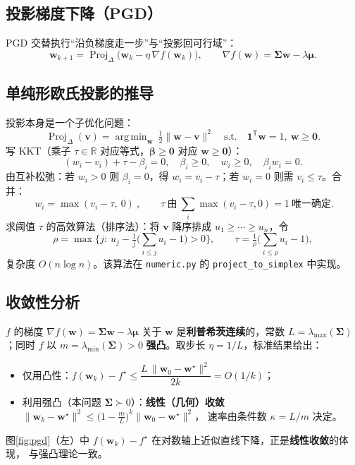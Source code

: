 \documentclass[12pt]{ctexart}
\newcommand{\R}{\mathbb{R}}
\newcommand{\w}{\bm{w}}
\newcommand{\muv}{\bm{\mu}}
\newcommand{\Sig}{\bm{\Sigma}}
\newcommand{\one}{\mathbf{1}}
\newcommand{\T}{^{\mathsf{T}}}
\DeclareMathOperator*{\argmin}{arg\,min}
\theoremstyle{definition}
\theoremstyle{plain}
\begin{document}
\subsection{投影梯度下降（PGD）}
PGD 交替执行“沿负梯度走一步”与“投影回可行域”：
\begin{equation}
\w_{k+1}=\operatorname{Proj}_{\Delta}\!\big(\w_k-\eta\,\nabla f(\w_k)\big),
\qquad \nabla f(\w)=\Sig\w-\lambda\muv .
\label{eq:pgd}
\end{equation}

\subsection{单纯形欧氏投影的推导}
投影本身是一个子优化问题：
\begin{equation}
\operatorname{Proj}_{\Delta}(\bm v)=\argmin_{\w}\ \tfrac12\|\w-\bm v\|^2
\quad\text{s.t.}\quad \one\T\w=1,\ \w\ge\bm0 .
\end{equation}
写 KKT（乘子 $\tau\in\R$ 对应等式，$\bm\beta\ge\bm0$ 对应 $\w\ge\bm0$）：
\[
(w_i-v_i)+\tau-\beta_i=0,\quad \beta_i\ge0,\quad w_i\ge0,\quad \beta_i w_i=0 .
\]
由互补松弛：若 $w_i>0$ 则 $\beta_i=0$，得 $w_i=v_i-\tau$；若 $w_i=0$ 则需 $v_i\le\tau$。合并：
\begin{equation}
\boxed{\ w_i=\max(v_i-\tau,\ 0)\ },\qquad \tau\ \text{由}\ \sum_i\max(v_i-\tau,0)=1\ \text{唯一确定.}
\end{equation}
求阈值 $\tau$ 的高效算法（排序法）：将 $\bm v$ 降序排成 $u_1\ge\cdots\ge u_n$，令
\begin{equation}
\rho=\max\Big\{j:\ u_j-\tfrac1j\big(\textstyle\sum_{i\le j}u_i-1\big)>0\Big\},
\qquad \tau=\tfrac1\rho\Big(\textstyle\sum_{i\le\rho}u_i-1\Big),
\end{equation}
复杂度 $O(n\log n)$。该算法在 \texttt{numeric.py} 的 \texttt{project\_to\_simplex} 中实现。

\subsection{收敛性分析}
$f$ 的梯度 $\nabla f(\w)=\Sig\w-\lambda\muv$ 关于 $\w$ 是\textbf{利普希茨连续}的，常数
$L=\lambda_{\max}(\Sig)$；同时 $f$ 以 $m=\lambda_{\min}(\Sig)>0$ \textbf{强凸}。取步长
$\eta=1/L$，标准结果给出：
\begin{itemize}[nosep]
  \item 仅用凸性：$f(\w_k)-f^\star\le \dfrac{L\,\|\w_0-\w^\star\|^2}{2k}=O(1/k)$；
  \item 利用强凸（本问题 $\Sig\succ0$）：\textbf{线性（几何）收敛}
        $\|\w_k-\w^\star\|^2\le\big(1-\tfrac{m}{L}\big)^k\|\w_0-\w^\star\|^2$，
        速率由条件数 $\kappa=L/m$ 决定。
\end{itemize}
图\ref{fig:pgd}（左）中 $f(\w_k)-f^\star$ 在对数轴上近似直线下降，正是\textbf{线性收敛}的体现，
与强凸理论一致。
\end{document}
